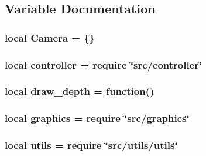 \subsection{Variable Documentation}
\hypertarget{camera_8lua_a60ee871fa7bdd28508803133dc40a60e}{
\subsubsection[{Camera}]{\setlength{\rightskip}{0pt plus 5cm}local Camera = \{\}}}\label{camera_8lua_a60ee871fa7bdd28508803133dc40a60e}
\hypertarget{camera_8lua_a42ca47a193e6b84d402c2a9fab0a69f1}{
\subsubsection[{controller}]{\setlength{\rightskip}{0pt plus 5cm}local controller = require \char`\"{}src/controller\char`\"{}}}\label{camera_8lua_a42ca47a193e6b84d402c2a9fab0a69f1}
\hypertarget{camera_8lua_ae3fb2517a395f6d9e0f185b934763ad6}{
\subsubsection[{draw\-\_\-depth}]{\setlength{\rightskip}{0pt plus 5cm}local draw\-\_\-depth = function()}}\label{camera_8lua_ae3fb2517a395f6d9e0f185b934763ad6}
\hypertarget{camera_8lua_aae06ace8bee01f93d02dfaa4436de916}{
\subsubsection[{graphics}]{\setlength{\rightskip}{0pt plus 5cm}local graphics = require \char`\"{}src/graphics\char`\"{}}}\label{camera_8lua_aae06ace8bee01f93d02dfaa4436de916}
\hypertarget{camera_8lua_a9b2ba82def3d3656dc370bac0a641700}{
\subsubsection[{utils}]{\setlength{\rightskip}{0pt plus 5cm}local utils = require \char`\"{}src/utils/utils\char`\"{}}}\label{camera_8lua_a9b2ba82def3d3656dc370bac0a641700}
